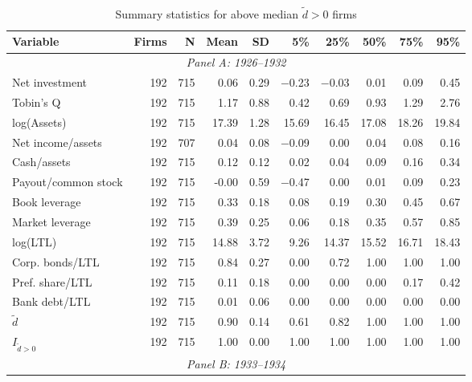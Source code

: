\begin{table}[p]\centering
    \caption{\\ Summary statistics for above median $\tilde{d} > 0$ firms}\scriptsize
    \label{tabapp:summary_I_larged}
    \begin{threeparttable}
        \begin{tabular}{lrrrrrrrrr}
            \toprule
            Variable & Firms & N & Mean & SD & 5\% & 25\% & 50\% & 75\% & 95\% \\
            \midrule
            \multicolumn{10}{c}{\textit{Panel A: 1926--1932}} \\
            \midrule
            Net investment & 192 & 715 & 0.06 & 0.29 & $-$0.23 & $-$0.03 & 0.01 & 0.09 & 0.45 \\
            Tobin's Q & 192 & 715 & 1.17 & 0.88 & 0.42 & 0.69 & 0.93 & 1.29 & 2.76 \\
            log(Assets) & 192 & 715 & 17.39 & 1.28 & 15.69 & 16.45 & 17.08 & 18.26 & 19.84 \\
            Net income/assets & 192 & 707 & 0.04 & 0.08 & $-$0.09 & 0.00 & 0.04 & 0.08 & 0.16 \\
            Cash/assets & 192 & 715 & 0.12 & 0.12 & 0.02 & 0.04 & 0.09 & 0.16 & 0.34 \\
            Payout/common stock & 192 & 715 & -0.00 & 0.59 & $-$0.47 & 0.00 & 0.01 & 0.09 & 0.23 \\
            Book leverage & 192 & 715 & 0.33 & 0.18 & 0.08 & 0.19 & 0.30 & 0.45 & 0.67 \\
            Market leverage & 192 & 715 & 0.39 & 0.25 & 0.06 & 0.18 & 0.35 & 0.57 & 0.85 \\
            log(LTL) & 192 & 715 & 14.88 & 3.72 & 9.26 & 14.37 & 15.52 & 16.71 & 18.43 \\
            Corp. bonds/LTL & 192 & 715 & 0.84 & 0.27 & 0.00 & 0.72 & 1.00 & 1.00 & 1.00 \\
            Pref. share/LTL & 192 & 715 & 0.11 & 0.18 & 0.00 & 0.00 & 0.00 & 0.17 & 0.42 \\
            Bank debt/LTL & 192 & 715 & 0.01 & 0.06 & 0.00 & 0.00 & 0.00 & 0.00 & 0.00 \\
            \ensuremath{\tilde{d}} & 192 & 715 & 0.90 & 0.14 & 0.61 & 0.82 & 1.00 & 1.00 & 1.00 \\
            \ensuremath{I_{\tilde{d}>0}} & 192 & 715 & 1.00 & 0.00 & 1.00 & 1.00 & 1.00 & 1.00 & 1.00 \\
            \midrule
            \multicolumn{10}{c}{\textit{Panel B: 1933--1934}} \\

\end{tabular}
\end{threeparttable}
\end{table}
